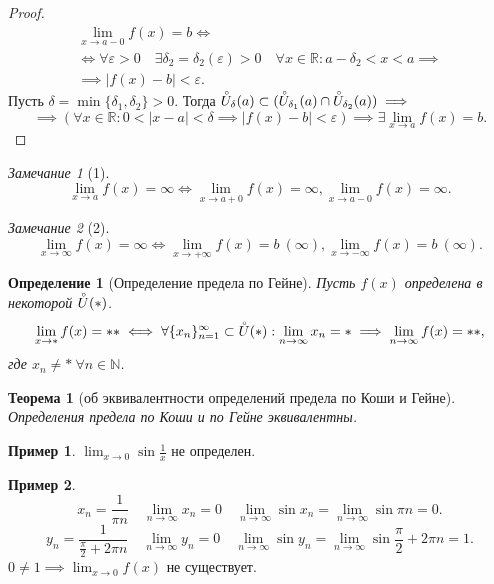 \documentclass[a4paper,12pt]{article} %
\newtheorem{definition}{Определение}[section]
\newtheorem{theorem}{Теорема}[section]
\theoremstyle{remark}
\newtheorem*{remark}{Замечание}
\theoremstyle{definition}
\newtheorem{exmp}{Пример}[section]
\begin{document}
\begin{proof}
	\begin{multline}
		\lim_{x \to a-0} f(x) = b \iff \\
		\iff \forall \varepsilon>0 \quad \exists \delta_2 = \delta_2(\varepsilon)>0 \quad \forall x\in \mathbb{R} : a -\delta_2 < x < a \implies \\
		\implies |f(x) - b| < \varepsilon.
	\end{multline}
	Пусть $\delta = \min \{\delta_1, \delta_2\} > 0$. Тогда $\accentset{\circ}{U}_\delta(a)\subset (\accentset{\circ}{U}_{\delta_1}(a)\cap \accentset{\circ}{U}_{\delta_2}(a)) \implies$
	\[
		\implies (\forall x\in \mathbb{R} : 0 < |x-a| < \delta \implies |f(x)-b| < \varepsilon) \implies \exists \lim_{x \to a} f(x) = b
	.\]
\end{proof}

\begin{remark}[1]
		\[
		\lim_{x \to a} f(x) = \infty \iff \lim_{x \to a+0} f(x) = \infty, \lim_{x \to a-0} f(x) = \infty
		.\] 
\end{remark}
\begin{remark}[2]
	\[
		\lim_{x \to \infty} f(x) = \infty \iff \lim_{x \to +\infty} f(x) = b \ (\infty), \lim_{x \to -\infty} f(x) = b \ (\infty)
	.\] 
\end{remark}

\begin{definition}[Определение предела по Гейне]
	Пусть $f(x)$ определена в некоторой $\accentset{\circ}{U}(*)$.
	\[
	\lim_{x \to *} f(x) = ** \iff \forall \{x_n\}_{n=1}^{\infty} \subset \accentset{\circ}{U}(*) : \lim_{n \to \infty} x_n = * \implies \lim_{n \to \infty} f(x) = **,
	\]
где $x_n \neq * \ \forall n\in \mathbb{N}$.
\end{definition}

\begin{theorem}[об эквивалентности определений предела по Коши и Гейне]
	Определения предела по Коши и по Гейне эквивалентны.
\end{theorem}

\begin{exmp}
	$\lim_{x \to 0} \sin{\frac{1}{x}}$ не определен.
\end{exmp}

\begin{exmp}
	\[
		x_n = \frac{1}{\pi n} \quad \lim_{n \to \infty} x_n = 0 \quad \lim_{n \to \infty} \sin{x_n} = \lim_{n \to \infty} \sin{\pi n} = 0
	.\] 
	\[
		y_n = \frac{1}{\frac{\pi}{2} + 2\pi n} \quad \lim_{n \to \infty} y_n = 0 \quad \lim_{n \to \infty} \sin{y_n} = \lim_{n \to \infty} \sin{\frac{\pi}{2} + 2\pi n} = 1
	.\] 
	$0 \neq 1 \implies \lim_{x \to 0} f(x)$ не существует.
\end{exmp}
\end{document}
